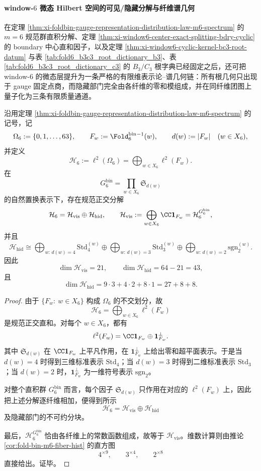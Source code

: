 \paragraph{window-\texorpdfstring{$6$}{6} 微态 Hilbert 空间的可见/隐藏分解与纤维谱几何}
在定理 \ref{thm:xi-foldbin-gauge-representation-distribution-law-m6-spectrum} 的 \(m=6\) 规范群直积分解、定理 \ref{thm:xi-window6-center-exact-splitting-bdry-cyclic} 的 boundary 中心直和因子，以及定理 \ref{thm:xi-window6-cyclic-kernel-bc3-root-datum} 与表 \ref{tab:fold6_b3c3_root_dictionary_b3}、表 \ref{tab:fold6_b3c3_root_dictionary_c3} 的 \(B_3/C_3\) 根字典已经固定之后，还可把 window-\(6\) 的微态层提升为一条严格的有限维表示论--谱几何链：所有根几何只出现于 gauge 固定点商，而隐藏部门完全由各纤维的零和模组成，并在同纤维团图上量子化为三条有限质量通道。

\begin{theorem}\label{thm:xi-time-part55d-window6-microstate-hilbert-gauge-splitting}
沿用定理 \ref{thm:xi-foldbin-gauge-representation-distribution-law-m6-spectrum} 的记号，记
\[
\Omega_6:=\{0,1,\dots,63\},
\qquad
F_w:=\Fold_6^{\mathrm{bin}}{}^{-1}(w),
\qquad
d(w):=|F_w|
\quad (w\in X_6),
\]
并定义
\[
\mathcal H_6:=\ell^2(\Omega_6)
=
\bigoplus_{w\in X_6}\ell^2(F_w).
\]
在
\[
G_6^{\mathrm{bin}}
=
\prod_{w\in X_6}\mathfrak S_{d(w)}
\]
的自然置换表示下，存在规范正交分解
\[
\mathcal H_6=\mathcal H_{\mathrm{vis}}\oplus \mathcal H_{\mathrm{hid}},
\qquad
\mathcal H_{\mathrm{vis}}
:=
\bigoplus_{w\in X_6}\CC \mathbf 1_{F_w}
=
\mathcal H_6^{G_6^{\mathrm{bin}}},
\]
并且
\[
\mathcal H_{\mathrm{hid}}
\cong
\bigoplus_{w:\,d(w)=4}\mathrm{Std}_4^{(w)}
\oplus
\bigoplus_{w:\,d(w)=3}\mathrm{Std}_3^{(w)}
\oplus
\bigoplus_{w:\,d(w)=2}\mathrm{sgn}_2^{(w)}.
\]
因此
\[
\dim \mathcal H_{\mathrm{vis}}=21,
\qquad
\dim \mathcal H_{\mathrm{hid}}=64-21=43,
\]
且
\[
\dim \mathcal H_{\mathrm{hid}}
=
9\cdot 3+4\cdot 2+8\cdot 1
=
27+8+8.
\]
\end{theorem}
\begin{proof}
由于 \(\{F_w:\ w\in X_6\}\) 构成 \(\Omega_6\) 的不交划分，故
\[
\mathcal H_6
=
\bigoplus_{w\in X_6}\ell^2(F_w)
\]
是规范正交直和。对每个 \(w\in X_6\)，都有
\[
\ell^2(F_w)=\CC \mathbf 1_{F_w}\oplus \mathbf 1_{F_w}^{\perp}.
\]
其中 \(\mathfrak S_{d(w)}\) 在 \(\CC \mathbf 1_{F_w}\) 上平凡作用，在 \(\mathbf 1_{F_w}^{\perp}\) 上给出零和超平面表示。于是当 \(d(w)=4\) 时得到三维标准表示 \(\mathrm{Std}_4\)；当 \(d(w)=3\) 时得到二维标准表示 \(\mathrm{Std}_3\)；当 \(d(w)=2\) 时，\(\mathbf 1_{F_w}^{\perp}\) 为一维符号表示 \(\mathrm{sgn}_2\)。

对整个直积群 \(G_6^{\mathrm{bin}}\) 而言，每个因子 \(\mathfrak S_{d(w)}\) 只作用在对应的 \(\ell^2(F_w)\) 上，因此把上述分解逐纤维相加，便得到所示
\[
\mathcal H_6=\mathcal H_{\mathrm{vis}}\oplus \mathcal H_{\mathrm{hid}}
\]
及隐藏部门的不可约分块。

最后，\(\mathcal H_6^{G_6^{\mathrm{bin}}}\) 恰由各纤维上的常数函数组成，故等于 \(\mathcal H_{\mathrm{vis}}\)。维数计算则由推论 \ref{cor:fold-bin-m6-fiber-hist} 的直方图
\[
4^{\times 9},\qquad 3^{\times 4},\qquad 2^{\times 8}
\]
直接给出。证毕。
\end{proof}

